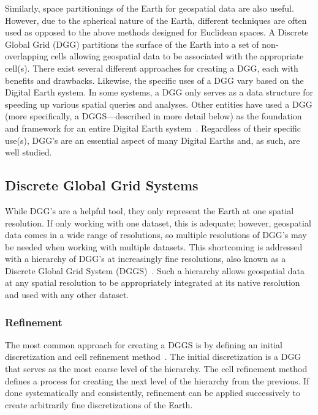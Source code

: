 Similarly, space partitionings of the Earth for geospatial data are also useful.
However, due to the spherical nature of the Earth, different techniques are often used as opposed to the above methods designed for Euclidean spaces.
A Discrete Global Grid (DGG) partitions the surface of the Earth into a set of non-overlapping cells allowing geospatial data to be associated with the appropriate cell(s).
There exist several different approaches for creating a DGG, each with benefits and drawbacks.
Likewise, the specific uses of a DGG vary based on the Digital Earth system.
In some systems, a DGG only serves as a data structure for speeding up various spatial queries and analyses.
Other entities have used a DGG (more specifically, a DGGS---described in more detail below) as the foundation and framework for an entire Digital Earth system~\cite{peterson2011close}.
Regardless of their specific use(s), DGG's are an essential aspect of many Digital Earths and, as such, are well studied.


\subsection{Discrete Global Grid Systems} \label{chap:2:DGGS}
While DGG's are a helpful tool, they only represent the Earth at one spatial resolution.
If only working with one dataset, this is adequate; however, geospatial data comes in a wide range of resolutions, so multiple resolutions of DGG's may be needed when working with multiple datasets.
This shortcoming is addressed with a hierarchy of DGG's at increasingly fine resolutions, also known as a Discrete Global Grid System (DGGS)~\cite{sahr1998discrete, sahr2003geodesic}.
Such a hierarchy allows geospatial data at any spatial resolution to be appropriately integrated at its native resolution and used with any other dataset.


\subsubsection{Refinement} \label{chap:2:refinement}
The most common approach for creating a DGGS is by defining an initial discretization and cell refinement method~\cite{mahdavi2015survey}.
The initial discretization is a DGG that serves as the most coarse level of the hierarchy. The cell refinement method defines a process for creating the next level of the hierarchy from the previous.
If done systematically and consistently, refinement can be applied successively to create arbitrarily fine discretizations of the Earth.


